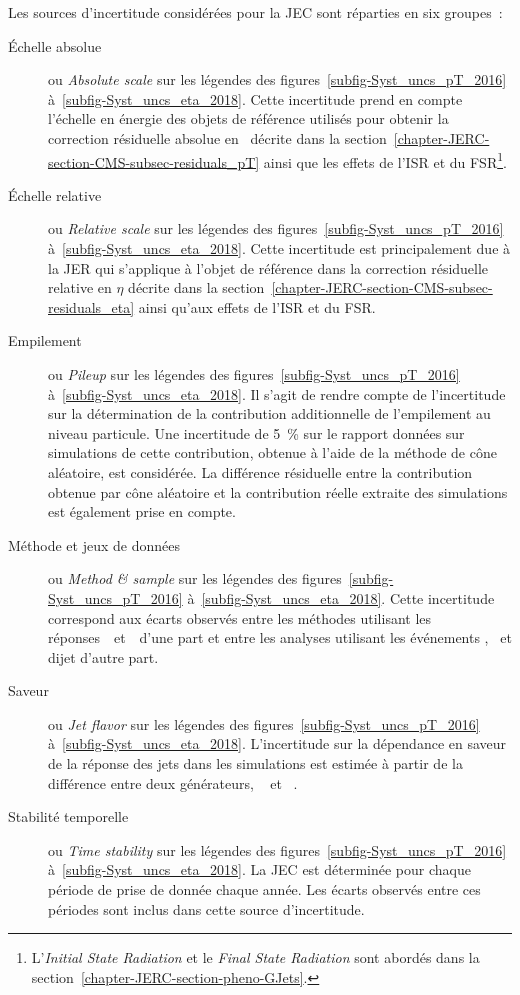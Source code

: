 Les sources d'incertitude considérées pour la JEC sont réparties en six groupes~\cite{CMS-DP-2020-019}:
\begin{description}
\item[Échelle absolue] ou \emph{Absolute scale} sur les légendes des figures~\ref{subfig-Syst_uncs_pT_2016} à~\ref{subfig-Syst_uncs_eta_2018}.
Cette incertitude prend en compte l'échelle en énergie des objets de référence utilisés pour obtenir la correction résiduelle absolue en \pT\ décrite dans la section~\ref{chapter-JERC-section-CMS-subsec-residuals_pT} ainsi que les effets de l'ISR et du FSR\footnote{L'\emph{Initial State Radiation} et le \emph{Final State Radiation} sont abordés dans la section~\ref{chapter-JERC-section-pheno-GJets}.}.
\item[Échelle relative] ou \emph{Relative scale} sur les légendes des figures~\ref{subfig-Syst_uncs_pT_2016} à~\ref{subfig-Syst_uncs_eta_2018}.
Cette incertitude est principalement due à la JER qui s'applique à l'objet de référence dans la correction résiduelle relative en $\eta$ décrite dans la section~\ref{chapter-JERC-section-CMS-subsec-residuals_eta} ainsi qu'aux effets de l'ISR et du FSR.
\item[Empilement] ou \emph{Pileup} sur les légendes des figures~\ref{subfig-Syst_uncs_pT_2016} à~\ref{subfig-Syst_uncs_eta_2018}.
Il s'agit de rendre compte de l'incertitude sur la détermination de la contribution additionnelle de l'empilement au niveau particule.
Une incertitude de \SI{5}{\%} sur le rapport données sur simulations de cette contribution, obtenue à l'aide de la méthode de cône aléatoire, est considérée.
La différence résiduelle entre la contribution obtenue par cône aléatoire et la contribution réelle extraite des simulations est également prise en compte.
\item[Méthode et jeux de données] ou \emph{Method \& sample} sur les légendes des figures~\ref{subfig-Syst_uncs_pT_2016} à~\ref{subfig-Syst_uncs_eta_2018}.
Cette incertitude correspond aux écarts observés entre les méthodes utilisant les réponses~\Rbal\ et~\RMPF\ d'une part et entre les analyses utilisant les événements \Zjets, \Gjets\ et dijet d'autre part.
\item[Saveur] ou \emph{Jet flavor} sur les légendes des figures~\ref{subfig-Syst_uncs_pT_2016} à~\ref{subfig-Syst_uncs_eta_2018}.
L'incertitude sur la dépendance en saveur de la réponse des jets dans les simulations est estimée à partir de la différence entre deux générateurs,
\PYTHIA~\cite{pythia6.4}
et
\HERWIG~\cite{herwig}.
\item[Stabilité temporelle] ou \emph{Time stability} sur les légendes des figures~\ref{subfig-Syst_uncs_pT_2016} à~\ref{subfig-Syst_uncs_eta_2018}.
La JEC est déterminée pour chaque période de prise de donnée chaque année. Les écarts observés entre ces périodes sont inclus dans cette source d'incertitude.
\end{description}
